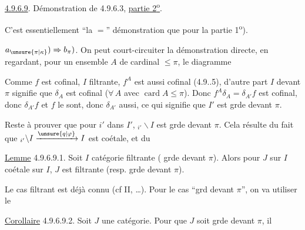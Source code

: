 
\uline{4.9.6.9}. Démonstration de 4.9.6.3, \uline{partie 2\textsuperscript{o}}.

C'est essentiellement ``la $=$'' démonstration que pour la partie 1\textsuperscript{o}).

$a_{\unsure{\pi|\kappa}})\Rightarrow b_\pi)$. On peut court-circuiter la démonstration directe, en regardant, pour un ensemble $A$ de cardinal $\leq\pi$, le diagramme


Comme $f$ est cofinal,  $I$ filtrante, $f^A$ est aussi cofinal (4.9..5), d'autre part $I$  devant $\pi$ signifie que $\delta_A$ est cofinal ($\forall\, A$ avec $\operatorname{card} A\leq\pi$). Donc $f^A\delta_A=\delta_{A'}f$ est cofinal, donc $\delta_{A'}f$ et $f$ le sont, donc $\delta_{A'}$ aussi, ce qui signifie que $I'$ est grde devant $\pi$.

Reste à prouver que pour $i'$ dans $I'$, $ {}_{i'}\backslash I$ est grde devant $\pi$. Cela résulte du fait que $ {}_{i'}\backslash I\xrightarrow{\unsure{q|\varphi}}I$ est coétale,  et du

\uline{Lemme} 4.9.6.9.1. Soit $I$  catégorie filtrante ( grde devant $\pi$).  Alors pour  $J$ sur $I$ coétale sur $I$,  $J$ est filtrante (resp. grde devant $\pi$).

 

Le cas filtrant est déjà connu (cf II, \ldots). Pour le cas ``grd devant $\pi$'', on va utiliser le

\uline{Corollaire} 4.9.6.9.2. Soit $J$ une catégorie. Pour que $J$ soit grde devant $\pi$, il

